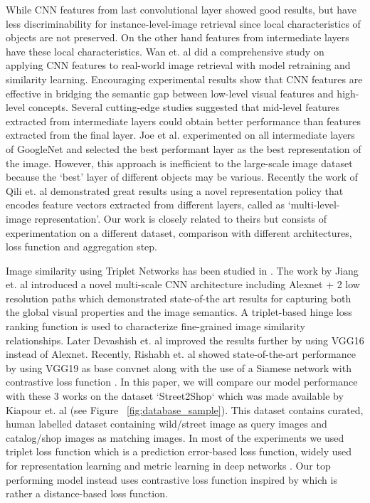 \documentclass[10pt,twocolumn,letterpaper]{article}
\begin{document}
While CNN features from last convolutional layer showed good results, but have less discriminability for instance-level-image retrieval since local characteristics of objects are not preserved. On the other hand features from intermediate layers have these local characteristics. Wan et. al \cite{c7} did a comprehensive study on applying CNN features to real-world image retrieval with model retraining and similarity learning. Encouraging experimental results show that CNN features are effective in bridging the semantic gap between low-level visual features and high-level concepts. Several cutting-edge studies \cite{c24, c25} suggested that mid-level features extracted from intermediate layers could obtain better performance than features extracted from the final layer. Joe et al. \cite{c8} experimented on all intermediate layers of GoogleNet and selected the best performant layer as the best representation of the image. However, this approach is inefficient to the large-scale image dataset because the ‘best’ layer of different objects may be various. Recently the work of Qili et. al \cite{c9} demonstrated great results using a novel representation
policy that encodes feature vectors extracted from different layers, called as ‘multi-level-image representation’. Our work is closely related to theirs but consists of experimentation on a different dataset, comparison with different architectures, loss function and aggregation step.

Image similarity using Triplet Networks has been studied in \cite{c1, c26}. The work by Jiang et. al \cite{c1} introduced a novel multi-scale CNN architecture including Alexnet + 2 low resolution paths which demonstrated state-of-the art results for capturing both the global visual properties and the image semantics. A triplet-based hinge loss ranking function is used to characterize fine-grained image similarity relationships. Later Devashish et. al \cite{c2} improved the results further by using VGG16 instead of Alexnet. Recently, Rishabh et. al \cite{c3} showed state-of-the-art performance by using VGG19 as base convnet along with the use of a Siamese network with contrastive loss function \cite{c27}. In this paper, we will compare our model performance with these 3 works on the dataset ‘Street2Shop‘ which was made available by Kiapour et. al \cite{c4} (see Figure ~\ref{fig:database_sample}). This dataset contains curated, human labelled dataset containing wild/street image as query images and catalog/shop images as matching images. In most of the experiments we used triplet loss function which is a prediction error-based loss function, widely used for representation learning and metric learning in deep networks \cite{c1,c28,c29}. Our top performing model instead uses contrastive loss function \cite{c27} inspired by \cite{c3} which is rather a distance-based loss function.
\end{document}
